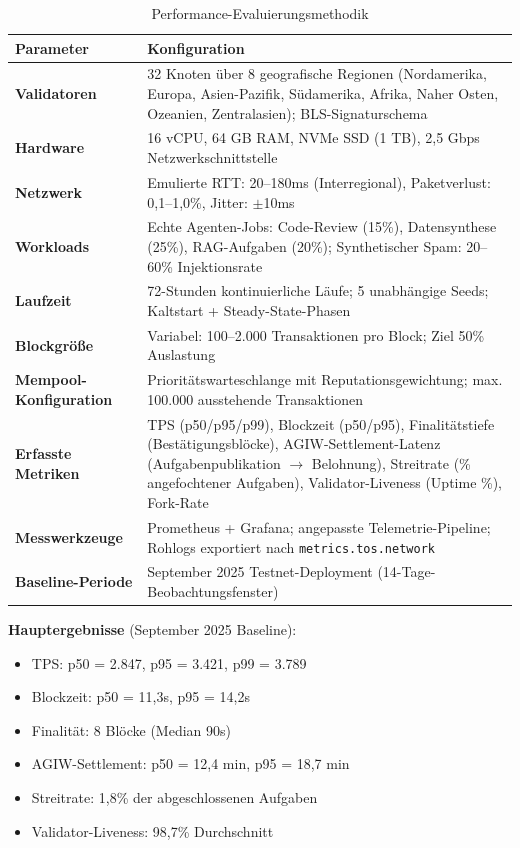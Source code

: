 \documentclass[11pt]{article}
\begin{document}
\begin{table}[H]
\centering
\caption{Performance-Evaluierungsmethodik}
\label{tab:evaluation-methodology}
\begin{tabular}{@{}p{}p{}@{}}
\toprule
\textbf{Parameter} & \textbf{Konfiguration} \\ \midrule
\textbf{Validatoren} & 32 Knoten über 8 geografische Regionen (Nordamerika, Europa, Asien-Pazifik, Südamerika, Afrika, Naher Osten, Ozeanien, Zentralasien); BLS-Signaturschema \\
\textbf{Hardware} & 16 vCPU, 64 GB RAM, NVMe SSD (1 TB), 2,5 Gbps Netzwerkschnittstelle \\
\textbf{Netzwerk} & Emulierte RTT: 20--180ms (Interregional), Paketverlust: 0,1--1,0\%, Jitter: $\pm$10ms \\
\textbf{Workloads} & Echte Agenten-Jobs: Code-Review (15\%), Datensynthese (25\%), RAG-Aufgaben (20\%); Synthetischer Spam: 20--60\% Injektionsrate \\
\textbf{Laufzeit} & 72-Stunden kontinuierliche Läufe; 5 unabhängige Seeds; Kaltstart + Steady-State-Phasen \\
\textbf{Blockgröße} & Variabel: 100--2.000 Transaktionen pro Block; Ziel 50\% Auslastung \\
\textbf{Mempool-Konfiguration} & Prioritätswarteschlange mit Reputationsgewichtung; max. 100.000 ausstehende Transaktionen \\
\textbf{Erfasste Metriken} & TPS (p50/p95/p99), Blockzeit (p50/p95), Finalitätstiefe (Bestätigungsblöcke), AGIW-Settlement-Latenz (Aufgabenpublikation $\rightarrow$ Belohnung), Streitrate (\% angefochtener Aufgaben), Validator-Liveness (Uptime \%), Fork-Rate \\
\textbf{Messwerkzeuge} & Prometheus + Grafana; angepasste Telemetrie-Pipeline; Rohlogs exportiert nach \texttt{metrics.tos.network} \\
\textbf{Baseline-Periode} & September 2025 Testnet-Deployment (14-Tage-Beobachtungsfenster) \\
\bottomrule
\end{tabular}
\end{table}

\textbf{Hauptergebnisse} (September 2025 Baseline):
\begin{itemize}[noitemsep]
  \item TPS: p50 = 2.847, p95 = 3.421, p99 = 3.789
  \item Blockzeit: p50 = 11,3s, p95 = 14,2s
  \item Finalität: 8 Blöcke (Median 90s)
  \item AGIW-Settlement: p50 = 12,4 min, p95 = 18,7 min
  \item Streitrate: 1,8\% der abgeschlossenen Aufgaben
  \item Validator-Liveness: 98,7\% Durchschnitt
\end{itemize}
\end{document}
